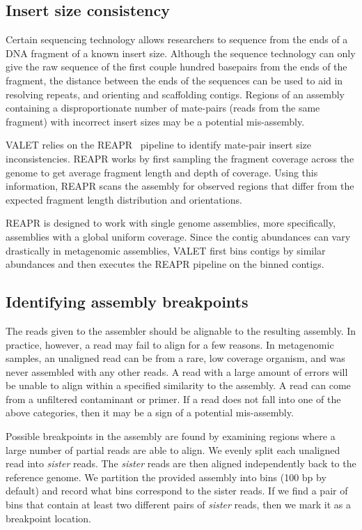\subsection{Insert size consistency}
Certain sequencing technology allows researchers to sequence from the ends of a DNA fragment of a known insert size.  Although the sequence technology can only give the raw sequence of the first couple hundred basepairs from the ends of the fragment, the distance between the ends of the sequences can be used to aid in resolving repeats, and orienting and scaffolding contigs.  Regions of an assembly containing a disproportionate number of mate-pairs (reads from the same fragment) with incorrect insert sizes may be a potential mis-assembly.

VALET relies on the REAPR~\cite{hunt2013reapr} pipeline to identify mate-pair insert size inconsistencies.  REAPR works by first sampling the fragment coverage across the genome to get average fragment length and depth of coverage.  Using this information, REAPR scans the assembly for observed regions that differ from the expected fragment length distribution and orientations.

REAPR is designed to work with single genome assemblies, more specifically, assemblies with a global uniform coverage.  Since the contig abundances can vary drastically in metagenomic assemblies, VALET first bins contigs by similar abundances and then executes the REAPR pipeline on the binned contigs.

\subsection{Identifying assembly breakpoints}
The reads given to the assembler should be alignable to the resulting assembly.
In practice, however, a read may fail to align for a few reasons.
In metagenomic samples, an unaligned read can be from a rare, low coverage organism, and was never assembled with any other reads.
A read with a large amount of errors will be unable to align within a specified similarity to the assembly.
A read can come from a unfiltered contaminant or primer.
If a read does not fall into one of the above categories, then it may be a sign of a potential mis-assembly.

Possible breakpoints in the assembly are found by examining regions where a large number of partial reads are able to align.
We evenly split each unaligned read into \emph{sister} reads.
The \emph{sister} reads are then aligned independently back to the reference genome.
We partition the provided assembly into bins (100 bp by default) and record what bins correspond to the sister reads.
If we find a pair of bins that contain at least two different pairs of \textit{sister} reads, then we mark it as a breakpoint location.

